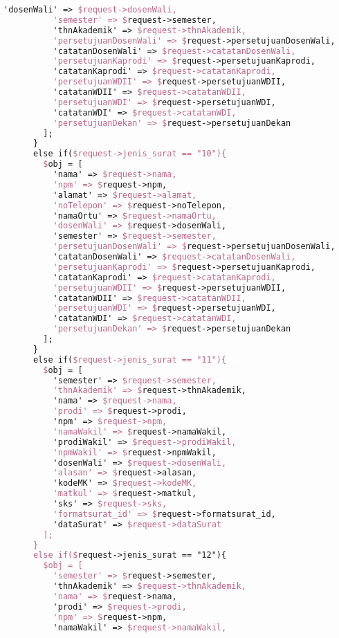 \begin{lstlisting}[language=tex,basicstyle=\tiny,caption=PesanansuratController.php]
          'dosenWali' => $request->dosenWali,
          'semester' => $request->semester,
          'thnAkademik' => $request->thnAkademik,
          'persetujuanDosenWali' => $request->persetujuanDosenWali,
          'catatanDosenWali' => $request->catatanDosenWali,
          'persetujuanKaprodi' => $request->persetujuanKaprodi,
          'catatanKaprodi' => $request->catatanKaprodi,
          'persetujuanWDII' => $request->persetujuanWDII,
          'catatanWDII' => $request->catatanWDII,
          'persetujuanWDI' => $request->persetujuanWDI,
          'catatanWDI' => $request->catatanWDI,
          'persetujuanDekan' => $request->persetujuanDekan
        ];
      }
      else if($request->jenis_surat == "10"){
        $obj = [
          'nama' => $request->nama,
          'npm' => $request->npm,
          'alamat' => $request->alamat,
          'noTelepon' => $request->noTelepon,
          'namaOrtu' => $request->namaOrtu,
          'dosenWali' => $request->dosenWali,
          'semester' => $request->semester,
          'persetujuanDosenWali' => $request->persetujuanDosenWali,
          'catatanDosenWali' => $request->catatanDosenWali,
          'persetujuanKaprodi' => $request->persetujuanKaprodi,
          'catatanKaprodi' => $request->catatanKaprodi,
          'persetujuanWDII' => $request->persetujuanWDII,
          'catatanWDII' => $request->catatanWDII,
          'persetujuanWDI' => $request->persetujuanWDI,
          'catatanWDI' => $request->catatanWDI,
          'persetujuanDekan' => $request->persetujuanDekan
        ];
      }
      else if($request->jenis_surat == "11"){
        $obj = [
          'semester' => $request->semester,
          'thnAkademik' => $request->thnAkademik,
          'nama' => $request->nama,
          'prodi' => $request->prodi,
          'npm' => $request->npm,
          'namaWakil' => $request->namaWakil,
          'prodiWakil' => $request->prodiWakil,
          'npmWakil' => $request->npmWakil,
          'dosenWali' => $request->dosenWali,
          'alasan' => $request->alasan,
          'kodeMK' => $request->kodeMK,
          'matkul' => $request->matkul,
          'sks' => $request->sks,
          'formatsurat_id' => $request->formatsurat_id,
          'dataSurat' => $request->dataSurat
        ];
      }
      else if($request->jenis_surat == "12"){
        $obj = [
          'semester' => $request->semester,
          'thnAkademik' => $request->thnAkademik,
          'nama' => $request->nama,
          'prodi' => $request->prodi,
          'npm' => $request->npm,
          'namaWakil' => $request->namaWakil,

\end{lstlisting}
